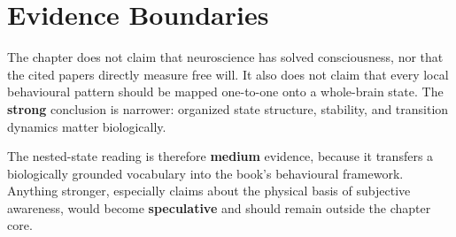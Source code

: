 \section{Evidence Boundaries}

The chapter does not claim that neuroscience has solved consciousness, nor
that the cited papers directly measure free will. It also does not claim that
every local behavioural pattern should be mapped one-to-one onto a whole-brain
state. The \textbf{strong} conclusion is narrower: organized state structure,
stability, and transition dynamics matter biologically.

The nested-state reading is therefore \textbf{medium} evidence, because it
transfers a biologically grounded vocabulary into the book's behavioural
framework. Anything stronger, especially claims about the physical basis of
subjective awareness, would become \textbf{speculative} and should remain
outside the chapter core.
